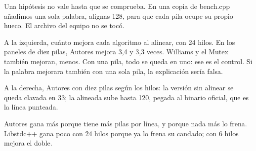 Una hipótesis no vale hasta que se comprueba. En una copia de bench.cpp añadimos una sola palabra, alignas 128, para que cada pila ocupe su propio hueco. El archivo del equipo no se tocó.

A la izquierda, cuánto mejora cada algoritmo al alinear, con 24 hilos. En los paneles de diez pilas, Autores mejora 3,4 y 3,3 veces. Williams y el Mutex también mejoran, menos. Con una pila, todo se queda en uno: ese es el control. Si la palabra mejorara también con una sola pila, la explicación sería falsa.

A la derecha, Autores con diez pilas según los hilos: la versión sin alinear se queda clavada en 33; la alineada sube hasta 120, pegada al binario oficial, que es la línea punteada.

Autores gana más porque tiene más pilas por línea, y porque nada más lo frena. Libstdc++ gana poco con 24 hilos porque ya lo frena su candado; con 6 hilos mejora el doble.
